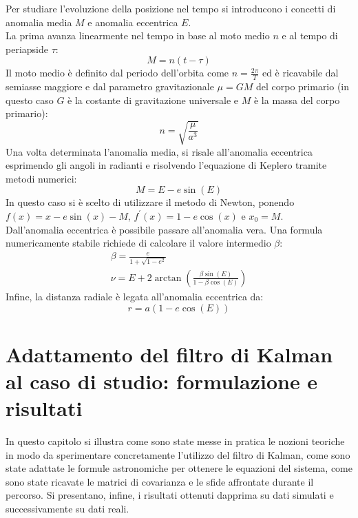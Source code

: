 \documentclass[12pt,a4paper,openright,twoside]{book}
\begin{document}
Per studiare l'evoluzione della posizione nel tempo si introducono i concetti di anomalia media $M$ e anomalia eccentrica $E$. \\
La prima avanza linearmente nel tempo in base al moto medio $n$ e al tempo di periapside $\tau$:
\begin{equation}\label{eq:advance-mean-anomaly}
M=n(t-\tau)
\end{equation}
Il moto medio è definito dal periodo dell'orbita come $n=\frac{2\pi}{T}$ ed è ricavabile dal semiasse maggiore e dal parametro gravitazionale $\mu=GM$ del corpo primario (in questo caso $G$ è la costante di gravitazione universale e $M$ è la massa del corpo primario):
\begin{equation}
n=\sqrt{\frac{\mu}{a^3}}
\end{equation}
Una volta determinata l'anomalia media, si risale all'anomalia eccentrica esprimendo gli angoli in radianti e risolvendo l'equazione di Keplero tramite metodi numerici:
\begin{equation}\label{eq:mean2ecc}
M=E-e\sin(E)
\end{equation}
In questo caso si è scelto di utilizzare il metodo di Newton, ponendo $f(x)=x-e\sin(x)-M$, $f^\prime(x)=1-e\cos(x)$ e $x_0=M$. \\
Dall'anomalia eccentrica è possibile passare all'anomalia vera. Una formula numericamente stabile richiede di calcolare il valore intermedio $\beta$:
\begin{gather}
\beta=\frac{e}{1+\sqrt{1-e^2}} \\
\nu=E+2\arctan\left(\frac{\beta\sin(E)}{1-\beta\cos(E)}\right)\label{eq:ecc2true}
\end{gather}
Infine, la distanza radiale è legata all'anomalia eccentrica da:
\begin{equation}\label{eq:ecc2dist}
r=a(1-e\cos(E))
\end{equation}

\chapter{Adattamento del filtro di Kalman al caso di studio: formulazione e risultati}

In questo capitolo si illustra come sono state messe in pratica le nozioni teoriche in modo da sperimentare concretamente l'utilizzo del filtro di Kalman, come sono state adattate le formule astronomiche per ottenere le equazioni del sistema, come sono state ricavate le matrici di covarianza e le sfide affrontate durante il percorso. Si presentano, infine, i risultati ottenuti dapprima su dati simulati e successivamente su dati reali.
\end{document}
